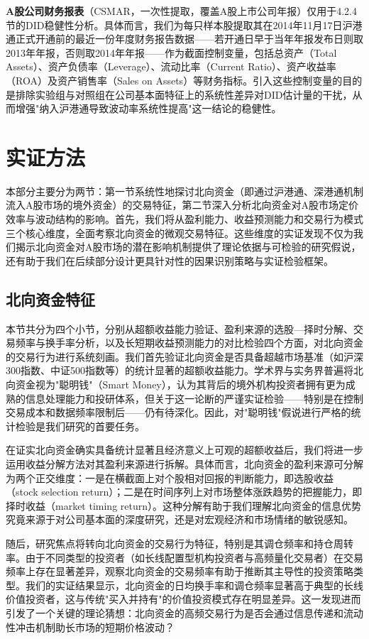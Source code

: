 \documentclass{article}
\begin{document}
\textbf{A股公司财务报表}（CSMAR，一次性提取，覆盖A股上市公司年报）仅用于4.2.4节的DID稳健性分析。具体而言，我们为每只样本股提取其在2014年11月17日沪港通正式开通前的最近一份年度财务报告数据——若开通日早于当年年报发布日则取2013年年报，否则取2014年年报——作为截面控制变量，包括总资产（Total Assets）、资产负债率（Leverage）、流动比率（Current Ratio）、资产收益率（ROA）及资产销售率（Sales on Assets）等财务指标。引入这些控制变量的目的是排除实验组与对照组在公司基本面特征上的系统性差异对DID估计量的干扰，从而增强"纳入沪港通导致波动率系统性提高"这一结论的稳健性。

\newpage
\section{实证方法}

本部分主要分为两节：第一节系统性地探讨北向资金（即通过沪港通、深港通机制流入A股市场的境外资金）的交易特征，第二节深入分析北向资金对A股市场定价效率与波动结构的影响。首先，我们将从盈利能力、收益预测能力和交易行为模式三个核心维度，全面考察北向资金的微观交易特征。这些维度的实证发现不仅为我们揭示北向资金对A股市场的潜在影响机制提供了理论依据与可检验的研究假说，还有助于我们在后续部分设计更具针对性的因果识别策略与实证检验框架。

\subsection{北向资金特征}

本节共分为四个小节，分别从超额收益能力验证、盈利来源的选股—择时分解、交易频率与换手率分析，以及长短期收益预测能力的对比检验四个方面，对北向资金的交易行为进行系统刻画。我们首先验证北向资金是否具备超越市场基准（如沪深300指数、中证500指数等）的统计显著的超额收益能力。学术界与实务界普遍将北向资金视为"聪明钱"（Smart Money），认为其背后的境外机构投资者拥有更为成熟的信息处理能力和投研体系，但关于这一论断的严谨实证检验——特别是在控制交易成本和数据频率限制后——仍有待深化。因此，对"聪明钱"假说进行严格的统计检验是我们研究的首要任务。

在证实北向资金确实具备统计显著且经济意义上可观的超额收益后，我们将进一步运用收益分解方法对其盈利来源进行拆解。具体而言，北向资金的盈利来源可分解为两个正交维度：一是在横截面上对个股相对回报的判断能力，即选股收益（stock selection return）；二是在时间序列上对市场整体涨跌趋势的把握能力，即择时收益（market timing return）。这种分解有助于我们理解北向资金的信息优势究竟来源于对公司基本面的深度研究，还是对宏观经济和市场情绪的敏锐感知。

随后，研究焦点将转向北向资金的交易行为特征，特别是其调仓频率和持仓周转率。由于不同类型的投资者（如长线配置型机构投资者与高频量化交易者）在交易频率上存在显著差异，观察北向资金的交易频率有助于推断其主导性的投资策略类型。我们的实证结果显示，北向资金的日均换手率和调仓频率显著高于典型的长线价值投资者，这与传统"买入并持有"的价值投资模式存在明显差异。这一发现进而引发了一个关键的理论猜想：北向资金的高频交易行为是否会通过信息传递和流动性冲击机制助长市场的短期价格波动？
\end{document}
